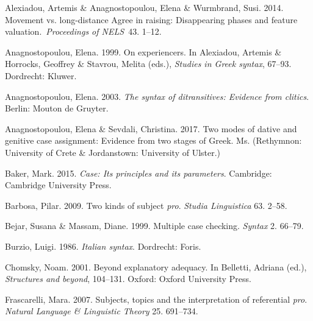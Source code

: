 \documentclass[output=paper]{langsci/langscibook}
\begin{document}
\begin{styleNormalWeb}
Alexiadou, Artemis \& Anagnostopoulou, Elena \& Wurmbrand, Susi. 2014. Movement vs. long-distance Agree in raising: Disappearing phases and feature valuation.~\textit{Proceedings of NELS~}43. 1–12.
\end{styleNormalWeb}

\begin{stylepi}
Anagnostopoulou, Elena. 1999. On experiencers. In Alexiadou, Artemis \& Horrocks, Geoffrey \& Stavrou, Melita (eds.), \textit{Studies in Greek syntax}, 67–93. Dordrecht: Kluwer.~
\end{stylepi}

\begin{styleNurTexti}
Anagnostopoulou, Elena. 2003. \textit{The syntax of ditransitives: Evidence from clitics}. Berlin: Mouton de Gruyter.
\end{styleNurTexti}

\begin{styleNurTexti}
Anagnostopoulou, Elena \& Sevdali, Christina. 2017. Two modes of dative and genitive case assignment: Evidence from two stages of Greek. Ms. (Rethymnon: University of Crete \& Jordanstown: University of Ulster.)
\end{styleNurTexti}

\begin{styleNurTexti}
Baker, Mark. 2015. \textit{Case: Its principles and its parameters}. Cambridge: Cambridge University Press. 
\end{styleNurTexti}

Barbosa, Pilar. 2009. Two kinds of subject \textit{pro}. \textit{Studia Linguistica} 63. 2–58.

\begin{stylePlainText}
Bejar, Susana \& Massam, Diane. 1999. Multiple case checking. \textit{Syntax} 2. 66–79.
\end{stylePlainText}

\begin{stylePlainText}
Burzio, Luigi. 1986. \textit{Italian syntax}. Dordrecht: Foris.
\end{stylePlainText}

\begin{stylePlainText}
Chomsky, Noam. 2001. Beyond explanatory adequacy. In Belletti, Adriana (ed.), \textit{Structures and beyond}, 104–131. Oxford: Oxford University Press.
\end{stylePlainText}

Frascarelli, Mara. 2007. Subjects, topics and the interpretation of referential \textit{pro}. \textit{Natural Language \& Linguistic Theory} 25. 691–734.
\end{document}
